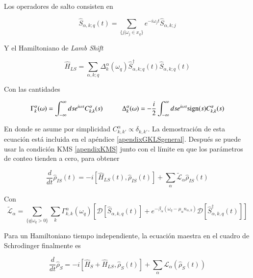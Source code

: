 Los operadores de salto consisten en

\begin{equation*}
    \hat{S}_{\alpha,k;q}(t) = \sum_{\{j|\omega_{j}\in x_{q} \} } e^{-i\omega_{j}t}\hat{S}_{\alpha,k;j}
\end{equation*}

Y el Hamiltoniano de \textit{Lamb Shift}

\begin{equation*}
    \hat{H}_{LS} = \sum_{\alpha,k;q} \Delta^{\alpha}_{k}(\omega_{q}) \hat{S}^{\dagger}_{\alpha,k;q}(t)\hat{S}_{\alpha,k;q}(t)
\end{equation*}

Con las cantidades

\begin{equation*}
    \Gamma_{k}^{\alpha}(\omega) = \int_{-\infty}^{\infty}ds e^{i\omega s}C^{\alpha}_{k,k}(s) \hspace{10mm} \Delta^{\alpha}_{k}(\omega) = - \frac{i}{2} \int^{\infty}_{-\infty}ds e^{i\omega s} \text{sign}(s)C^{\alpha}_{k,k}(s)
\end{equation*}

En donde se asume por simplicidad $C^{\alpha}_{k,k'} \propto \delta_{k,k'}$. La demostración de esta ecuación está incluida en el apéndice \ref{apendixGKLSgeneral}. Después se puede usar la condición KMS \ref{apendixKMS} junto con el límite en que  los parámetros de conteo tienden a cero, para obtener

\begin{equation*}
    \frac{d}{dt}\hat{\rho}_{IS}(t) = - i[\hat{H}_{LS}(t),\hat{\rho}_{IS}(t)] + \sum_{\alpha}\tilde{\mathcal{L}}_{\alpha} \hat{\rho}_{IS}(t)
\end{equation*}

Con
\begin{equation*}
    \tilde{\mathcal{L}}_{\alpha} = \sum_{\{q|\omega_{q}>0\}} \sum_{k}\Gamma^{\alpha}_{k,k}(\omega_{q}) \left[ \mathcal{D}[\hat{S}_{\alpha,k,q}(t)] + e^{-\beta_{\alpha}(\omega_{q} - \mu_{\alpha}n_{\alpha,k})}\mathcal{D}[\hat{S}^{\dagger}_{\alpha,k,q}(t)]  \right]
\end{equation*}

Para un Hamiltoniano tiempo independiente, la ecuación maestra en el cuadro de Schrodinger finalmente es

\begin{equation}
    \frac{d}{dt}\hat{\rho}_{S} = -i [\hat{H}_{S}+ \hat{H}_{LS},\hat{\rho}_{S}(t)] + \sum_{\alpha}\mathcal{L}_{\alpha}(\hat{\rho}_{S}(t))
\label{sec2schrodingerthermo}
\end{equation}

